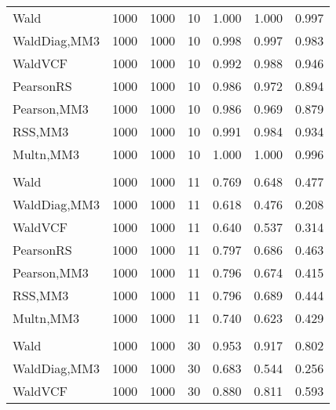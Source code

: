 \documentclass[
]{article}
\begin{document}
\begin{table}[H]
{\begin{tabular}[t]{lrrrrrr}
\hspace{1em}Wald & 1000 & 1000 & 10 & 1.000 & 1.000 & 0.997\\
\hspace{1em}WaldDiag,MM3 & 1000 & 1000 & 10 & 0.998 & 0.997 & 0.983\\
\hspace{1em}WaldVCF & 1000 & 1000 & 10 & 0.992 & 0.988 & 0.946\\
\hspace{1em}PearsonRS & 1000 & 1000 & 10 & 0.986 & 0.972 & 0.894\\
\hspace{1em}Pearson,MM3 & 1000 & 1000 & 10 & 0.986 & 0.969 & 0.879\\
\hspace{1em}RSS,MM3 & 1000 & 1000 & 10 & 0.991 & 0.984 & 0.934\\
\hspace{1em}Multn,MM3 & 1000 & 1000 & 10 & 1.000 & 1.000 & 0.996\\
\addlinespace[0.3em]
\multicolumn{7}{l}{\textbf{2F 10V}}\\
\hspace{1em}Wald & 1000 & 1000 & 11 & 0.769 & 0.648 & 0.477\\
\hspace{1em}WaldDiag,MM3 & 1000 & 1000 & 11 & 0.618 & 0.476 & 0.208\\
\hspace{1em}WaldVCF & 1000 & 1000 & 11 & 0.640 & 0.537 & 0.314\\
\hspace{1em}PearsonRS & 1000 & 1000 & 11 & 0.797 & 0.686 & 0.463\\
\hspace{1em}Pearson,MM3 & 1000 & 1000 & 11 & 0.796 & 0.674 & 0.415\\
\hspace{1em}RSS,MM3 & 1000 & 1000 & 11 & 0.796 & 0.689 & 0.444\\
\hspace{1em}Multn,MM3 & 1000 & 1000 & 11 & 0.740 & 0.623 & 0.429\\
\addlinespace[0.3em]
\multicolumn{7}{l}{\textbf{3F 15V}}\\
\hspace{1em}Wald & 1000 & 1000 & 30 & 0.953 & 0.917 & 0.802\\
\hspace{1em}WaldDiag,MM3 & 1000 & 1000 & 30 & 0.683 & 0.544 & 0.256\\
\hspace{1em}WaldVCF & 1000 & 1000 & 30 & 0.880 & 0.811 & 0.593\\

\end{tabular}}
\end{table}
\end{document}

